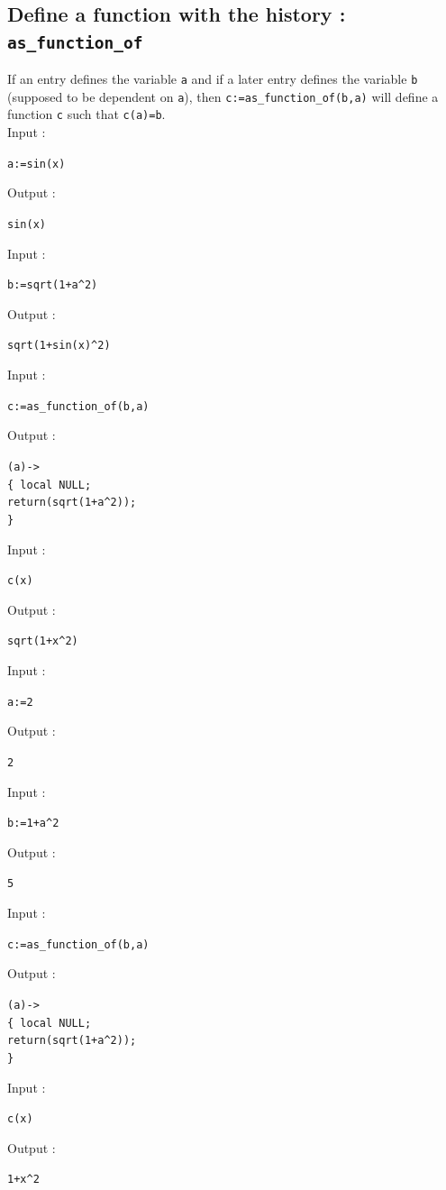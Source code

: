\documentclass[a4paper,11pt]{book}
\begin{document}
\subsection{Define a function with the history : {\tt as\_function\_of}}
\noindent If an entry defines the variable {\tt a} and if a later
entry defines the variable {\tt b} (supposed to be dependent on
{\tt a}), then
{\tt c:=as\_function\_of(b,a)} will define a function {\tt c} such that 
{\tt c(a)=b}.\\
Input :
\begin{center}{\tt  a:=sin(x)}\end{center}
Output :
\begin{center}{\tt  sin(x)}\end{center}
Input :
\begin{center}{\tt  b:=sqrt(1+a\verb|^|2)}\end{center}
Output :
\begin{center}{\tt  sqrt(1+sin(x)\verb|^|2)}\end{center}
Input :
\begin{center}{\tt  c:=as\_function\_of(b,a)}\end{center}
Output :
\begin{flushleft}{\tt (a)-> \\
\{ local NULL;\\ 
  return(sqrt(1+a\verb|^|2));\\  
\}}\end{flushleft}
Input :
\begin{center}{\tt  c(x)}\end{center}
Output :
\begin{center}{\tt sqrt(1+x\verb|^|2)}\end{center}
Input :
\begin{center}{\tt  a:=2}\end{center}
Output :
\begin{center}{\tt  2}\end{center}
Input :
\begin{center}{\tt  b:=1+a\verb|^|2}\end{center}
Output :
\begin{center}{\tt  5}\end{center}
Input :
\begin{center}{\tt  c:=as\_function\_of(b,a)}\end{center}
Output :
\begin{flushleft}{\tt (a)-> \\
\{ local NULL;\\ 
  return(sqrt(1+a\verb|^|2));\\  
\}}\end{flushleft}
Input :
\begin{center}{\tt  c(x)}\end{center}
Output :
\begin{center}{\tt 1+x\verb|^|2}\end{center}
\end{document}
